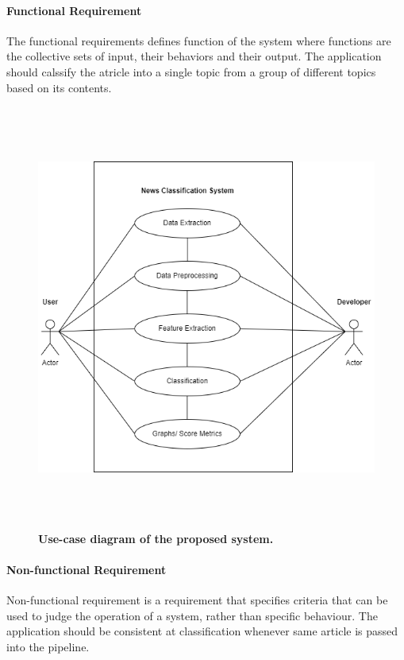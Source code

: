 \documentclass[12pt]{report}
\begin{document}
                \paragraph{Functional Requirement}
                The functional requirements defines function of the system where functions are the collective sets of
                input, their behaviors and their output.
                    The application should calssify the atricle into a single topic from a group of different topics based on its contents.
                    \begin{figure}[h]
                        \centering
                        \includegraphics[width=15.29cm, height=14cm]{use_case.drawio.png}
                        \caption{\textbf{Use-case diagram of the proposed system.}}
                    \end{figure}
                    \newpage 
                    
                
                \paragraph{Non-functional Requirement}
                Non-functional requirement is a requirement that specifies criteria that can be used to judge the
                operation of a system, rather than specific behaviour.
                    The application should be consistent at classification whenever same article is passed into  the pipeline. 
                    
\end{document}
